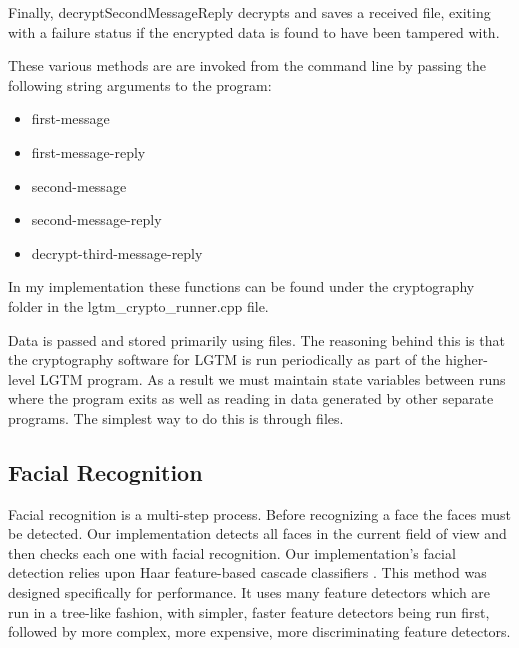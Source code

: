 \documentclass[12pt]{report}
\begin{document}
Finally, decryptSecondMessageReply decrypts and saves a received file, exiting with a failure status if the encrypted data is found to have been tampered with. \par

These various methods are are invoked from the command line by passing the following string arguments to the program: 

\begin{itemize}
    \item first-message
    \item first-message-reply
    \item second-message
    \item second-message-reply
    \item decrypt-third-message-reply
\end{itemize}

In my implementation these functions can be found under the cryptography folder in the lgtm\_crypto\_runner.cpp file. \par

Data is passed and stored primarily using files. The reasoning behind this is that the cryptography software for LGTM is run periodically as part of the higher-level LGTM program. As a result we must maintain state variables between runs where the program exits as well as reading in data generated by other separate programs. The simplest way to do this is through files. \par

\subsection{Facial Recognition}
Facial recognition is a multi-step process. Before recognizing a face the faces must be detected. Our implementation detects all faces in the current field of view and then checks each one with facial recognition. Our implementation's facial detection relies upon Haar feature-based cascade classifiers \cite{HaarCascadeViola2001}. This method was designed specifically for performance. It uses many feature detectors which are run in a tree-like fashion, with simpler, faster feature detectors being run first, followed by more complex, more expensive, more discriminating feature detectors. \par
\end{document}
